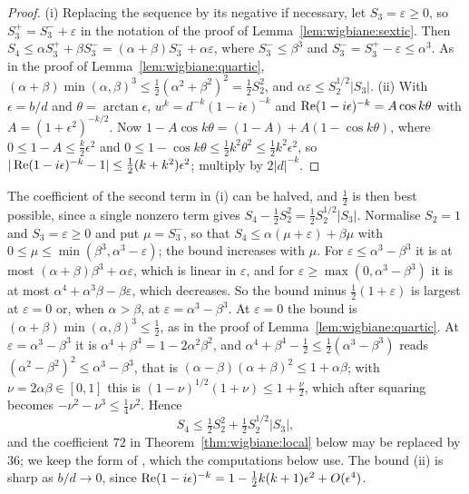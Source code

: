 \begin{proof}
(i) Replacing the sequence by its negative if necessary, let $S_3=\varepsilon\ge0$, so $S_3^+=S_3^-+\varepsilon$ in the notation of the proof of Lemma~\ref{lem:wigbiane:sextic}. Then $S_4\le\alpha S_3^++\beta S_3^-=(\alpha+\beta)S_3^-+\alpha\varepsilon$, where $S_3^-\le\beta^3$ and $S_3^-=S_3^+-\varepsilon\le\alpha^3$. As in the proof of Lemma~\ref{lem:wigbiane:quartic}, $(\alpha+\beta)\min(\alpha,\beta)^3\le\frac12(\alpha^2+\beta^2)^2=\frac12S_2^2$, and $\alpha\varepsilon\le S_2^{1/2}|S_3|$. (ii) With $\epsilon=b/d$ and $\theta=\arctan\epsilon$, $w^k=d^{-k}(1-i\epsilon)^{-k}$ and $\operatorname{Re}(1-i\epsilon)^{-k}=A\cos k\theta$ with $A=(1+\epsilon^2)^{-k/2}$. Now $1-A\cos k\theta=(1-A)+A(1-\cos k\theta)$, where $0\le1-A\le\frac k2\epsilon^2$ and $0\le1-\cos k\theta\le\frac12k^2\theta^2\le\frac12k^2\epsilon^2$, so $|\operatorname{Re}(1-i\epsilon)^{-k}-1|\le\frac12(k+k^2)\epsilon^2$; multiply by $2|d|^{-k}$.
\end{proof}

\begin{remark}\label{rem:wigbiane:shadow}
The coefficient of the second term in (i) can be halved, and $\frac12$ is then best possible, since a single nonzero term gives $S_4-\frac12S_2^2=\frac12S_2^{1/2}|S_3|$. Normalise $S_2=1$ and $S_3=\varepsilon\ge0$ and put $\mu=S_3^-$, so that $S_4\le\alpha(\mu+\varepsilon)+\beta\mu$ with $0\le\mu\le\min(\beta^3,\alpha^3-\varepsilon)$; the bound increases with $\mu$. For $\varepsilon\le\alpha^3-\beta^3$ it is at most $(\alpha+\beta)\beta^3+\alpha\varepsilon$, which is linear in $\varepsilon$, and for $\varepsilon\ge\max(0,\alpha^3-\beta^3)$ it is at most $\alpha^4+\alpha^3\beta-\beta\varepsilon$, which decreases. So the bound minus $\frac12(1+\varepsilon)$ is largest at $\varepsilon=0$ or, when $\alpha>\beta$, at $\varepsilon=\alpha^3-\beta^3$. At $\varepsilon=0$ the bound is $(\alpha+\beta)\min(\alpha,\beta)^3\le\frac12$, as in the proof of Lemma~\ref{lem:wigbiane:quartic}. At $\varepsilon=\alpha^3-\beta^3$ it is $\alpha^4+\beta^4=1-2\alpha^2\beta^2$, and $\alpha^4+\beta^4-\frac12\le\frac12(\alpha^3-\beta^3)$ reads $(\alpha^2-\beta^2)^2\le\alpha^3-\beta^3$, that is $(\alpha-\beta)(\alpha+\beta)^2\le1+\alpha\beta$; with $\nu=2\alpha\beta\in[0,1]$ this is $(1-\nu)^{1/2}(1+\nu)\le1+\frac\nu2$, which after squaring becomes $-\nu^2-\nu^3\le\frac14\nu^2$. Hence
\[
S_4\le\tfrac12S_2^2+\tfrac12S_2^{1/2}|S_3|,
\]
and the coefficient $72$ in Theorem~\ref{thm:wigbiane:local} below may be replaced by $36$; we keep the form of \cite{P26wig}, which the computations below use. The bound (ii) is sharp as $b/d\to0$, since $\operatorname{Re}(1-i\epsilon)^{-k}=1-\frac12k(k+1)\epsilon^2+O(\epsilon^4)$.
\end{remark}

